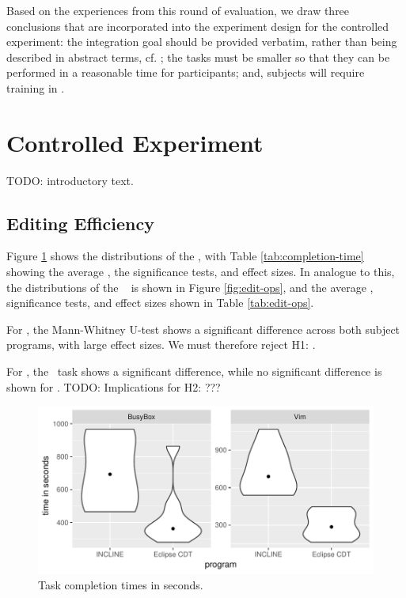 Based on the experiences from this round of evaluation, we draw three conclusions that are incorporated into the experiment design for the controlled experiment: the integration goal should be provided verbatim, rather than being described in abstract terms, cf. \cite{berger2016mps}; the tasks must be smaller so that they can be performed in a reasonable time for participants; and, subjects will require training in \tooln.


\section{Controlled Experiment}
TODO: introductory text.

\subsection{Editing Efficiency}
Figure \ref{fig:completion-times} shows the distributions of the \ctimes, with Table \ref{tab:completion-time} showing the average \ctimes, the significance tests, and effect sizes. In analogue to this, the distributions of the \eops~ is shown in Figure \ref{fig:edit-ops}, and the average \eops, significance tests, and effect sizes shown in Table \ref{tab:edit-ops}.

For \ctimes, the Mann-Whitney U-test shows a significant difference across both subject programs, with large effect sizes. We must therefore reject H1: \textit{\HA}.

For \eops, the \busybox~task shows a significant difference, while no significant difference is shown for \vim. TODO: Implications for H2: \textit{\HB}??? 

\begin{figure}[ht]
    \centering
    \includegraphics{figure/incl-violin-all.pdf}
    \caption{Task completion times in seconds.}
    \label{fig:completion-times}
\end{figure}

